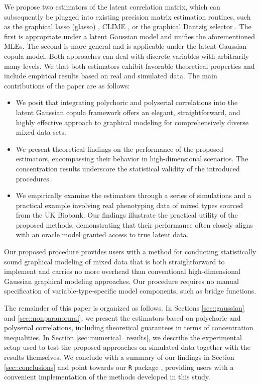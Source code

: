 We propose two estimators of the latent correlation matrix, which can subsequently be plugged into existing precision matrix estimation routines, such as the graphical lasso (glasso) \cite{Friedman08}, CLIME \cite{Cai11}, or the graphical Dantzig selector \cite{Yuan10}. The first is appropriate under a latent Gaussian model and unifies the aforementioned MLEs. The second is more general and is applicable under the latent Gaussian copula model. Both approaches can deal with discrete variables with arbitrarily many levels. We that both estimators exhibit favorable theoretical properties and include empirical results based on real and simulated data. The main contributions of the paper are as follows:
\begin{itemize}
    \item We posit that integrating polychoric and polyserial correlations into the latent Gaussian copula framework offers an elegant, straightforward, and highly effective approach to graphical modeling for comprehensively diverse mixed data sets.
    \item We present theoretical findings on the performance of the proposed estimators, encompassing their behavior in high-dimensional scenarios. The concentration results underscore the statistical validity of the introduced procedures.
    \item We empirically examine the estimators through a series of simulations and a practical example involving real phenotyping data of mixed types sourced from the UK Biobank. Our findings illustrate the practical utility of the proposed methods, demonstrating that their performance often closely aligns with an oracle model granted access to true latent data.
\end{itemize}

Our proposed procedure provides users with a method for conducting statistically sound graphical modeling of mixed data that is both straightforward to implement and carries no more overhead than conventional high-dimensional Gaussian graphical modeling approaches. Our procedure requires no manual specification of variable-type-specific model components, such as bridge functions.

The remainder of this paper is organized as follows. In Sections \ref{sec::gaussian} and \ref{sec::nonparanormal}, we present the estimators based on polychoric and polyserial correlations, including theoretical guarantees in terms of concentration inequalities. In Section \ref{sec::numerical_results}, we describe the experimental setup used to test the proposed approaches on simulated data together with the results themselves. %
We conclude with a summary of our findings in Section \ref{sec::conclusions} and point towards our \texttt{R} package , providing users with a convenient implementation of the methods developed in this study.

